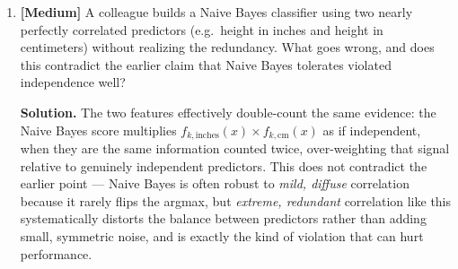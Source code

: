 \documentclass[11pt]{article}
\begin{document}
\begin{enumerate}
\textbf{Solution.} The likelihood can be driven arbitrarily close to 1 (negative log-likelihood to 0) by sending $\|\beta\|\to\infty$ in the separating direction, since fitted probabilities can be pushed arbitrarily close to 0 or 1 for every training point without penalty. So no finite maximizer exists: $\hat\beta$ does not converge (software typically issues a ``perfect separation'' warning). This shows convexity guarantees a global minimum \emph{if one exists} --- but existence itself can fail under separation.

\item \textbf{[Medium]} A colleague builds a Naive Bayes classifier using two nearly perfectly correlated predictors (e.g.\ height in inches and height in centimeters) without realizing the redundancy. What goes wrong, and does this contradict the earlier claim that Naive Bayes tolerates violated independence well?

\textbf{Solution.} The two features effectively double-count the same evidence: the Naive Bayes score multiplies $f_{k,\text{inches}}(x)\times f_{k,\text{cm}}(x)$ as if independent, when they are the same information counted twice, over-weighting that signal relative to genuinely independent predictors. This does not contradict the earlier point --- Naive Bayes is often robust to \emph{mild, diffuse} correlation because it rarely flips the argmax, but \emph{extreme, redundant} correlation like this systematically distorts the balance between predictors rather than adding small, symmetric noise, and is exactly the kind of violation that can hurt performance.

\end{enumerate}
\end{document}
